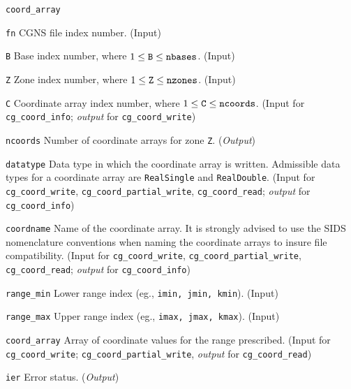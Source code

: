 \begin{Ventryi}{\texttt{coord\_array}}\raggedright
\item [\texttt{fn}]
      CGNS file index number.
      (\textcolor{input}{Input})
\item [\texttt{B}]
      Base index number, where $1 \leq \text{\texttt{B}} \leq \text{\texttt{nbases}}$.
      (\textcolor{input}{Input})
\item [\texttt{Z}]
      Zone index number, where $1 \leq \text{\texttt{Z}} \leq \text{\texttt{nzones}}$.
      (\textcolor{input}{Input})
\item [\texttt{C}]
      Coordinate array index number, where $1 \leq \text{\texttt{C}} \leq \text{\texttt{ncoords}}$.
      (\textcolor{input}{Input} for \texttt{cg\_coord\_info};
      \textcolor{output}{\textit{output}} for \texttt{cg\_coord\_write})
\item [\texttt{ncoords}]
      Number of coordinate arrays for zone \texttt{Z}.
      (\textcolor{output}{\textit{Output}})
\item [\texttt{datatype}]
      Data type in which the coordinate array is written.
      Admissible data types for a coordinate array are \texttt{RealSingle}
      and \texttt{RealDouble}.
      (\textcolor{input}{Input} for \texttt{cg\_coord\_write},
      \texttt{cg\_coord\_partial\_write}, \texttt{cg\_coord\_read};
      \textcolor{output}{\textit{output}} for \texttt{cg\_coord\_info})
\item [\texttt{coordname}]
      Name of the coordinate array.
      It is strongly advised to use the SIDS nomenclature conventions
      when naming the coordinate arrays to insure file compatibility.
      (\textcolor{input}{Input} for \texttt{cg\_coord\_write},
      \texttt{cg\_coord\_partial\_write}, \texttt{cg\_coord\_read};
      \textcolor{output}{\textit{output}} for \texttt{cg\_coord\_info})
\item [\texttt{range\_min}]
      Lower range index (eg., \texttt{imin, jmin, kmin}).
      (\textcolor{input}{Input})
\item [\texttt{range\_max}]
      Upper range index (eg., \texttt{imax, jmax, kmax}).
      (\textcolor{input}{Input})
\item [\texttt{coord\_array}]
      Array of coordinate values for the range prescribed.
      (\textcolor{input}{Input} for \texttt{cg\_coord\_write};
      \texttt{cg\_coord\_partial\_write}, \textcolor{output}{\textit{output}} for \texttt{cg\_coord\_read})
\item [\texttt{ier}]
      Error status.
      (\textcolor{output}{\textit{Output}})
\end{Ventryi}

